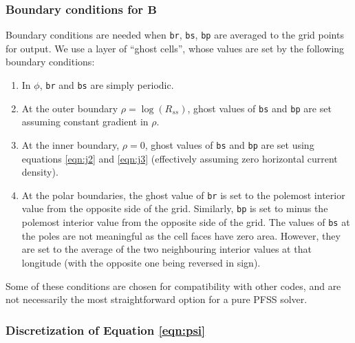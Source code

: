 \documentclass[11pt]{article}
\newcommand{\Bb}{\boldsymbol{B}}
\begin{document}
\subsubsection{Boundary conditions for $\Bb$}

Boundary conditions are needed when \texttt{br}, \texttt{bs}, \texttt{bp} are averaged to the grid points for output. We use a layer of ``ghost cells'', whose values are set by the following boundary conditions:
\begin{enumerate}
\item In $\phi$, \texttt{br} and \texttt{bs} are simply periodic.
\item At the outer boundary $\rho=\log(R_{ss})$, ghost values of \texttt{bs} and \texttt{bp} are set assuming constant gradient in $\rho$.
\item At the inner boundary, $\rho=0$, ghost values of \texttt{bs} and \texttt{bp} are set using equations \eqref{eqn:j2} and \eqref{eqn:j3} (effectively assuming zero horizontal current density).
\item At the polar boundaries, the ghost value of \texttt{br} is set to the polemost interior value from the opposite side of the grid. Similarly, \texttt{bp} is set to minus the polemost interior value from the opposite side of the grid. The values of \texttt{bs} at the poles are not meaningful as the cell faces have zero area. However, they are set to the average of the two neighbouring interior values at that longitude (with the opposite one being reversed in sign).
\end{enumerate}
Some of these conditions are chosen for compatibility with other codes, and are not necessarily the most straightforward option for a pure PFSS solver.

\subsubsection{Discretization of Equation \eqref{eqn:psi}}
\end{document}
